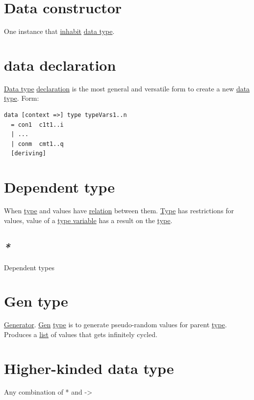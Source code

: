 \documentclass[a4paper,14pt,oneside]{book}
\begin{document}
\section{\label{orgb1a2b7f}Data constructor}
\label{sec:org2057b71}
One instance that \hyperref[orgab21a22]{inhabit} \hyperref[org89def2c]{data type}.

\section{\label{orgac64756}data declaration}
\label{sec:org878ded5}
\hyperref[org89def2c]{Data type} \hyperref[org648d60c]{declaration} is the most general and versatile form to create a new \hyperref[org89def2c]{data type}.
Form:
\begin{verbatim}
data [context =>] type typeVars1..n
  = con1  c1t1..i
  | ...
  | conm  cmt1..q
  [deriving]
\end{verbatim}

\section{\label{org1c0f154}Dependent type}
\label{sec:org12c57af}
When \hyperref[orgde40363]{type} and values have \hyperref[orgdeb75cd]{relation} between them. \hyperref[orgde40363]{Type} has restrictions for values, value of a \hyperref[orgc56d5a2]{type variable} has a result on the \hyperref[orgde40363]{type}.

\subsection{\emph{*}}
\label{sec:org47de72e}

\label{org623a08c}Dependent types

\section{\label{org610c8aa}Gen type}
\label{sec:org76e419f}
\hyperref[orgcc96589]{Generator}. \hyperref[org8300858]{Gen} \hyperref[orgde40363]{type} is to generate pseudo-random values for parent \hyperref[orgde40363]{type}. Produces a \hyperref[orga17c874]{list} of values that gets infinitely cycled.

\section{\label{org733c367}Higher-kinded data type}
\label{sec:orgccf9cc2}
Any combination of * and ->
\end{document}
